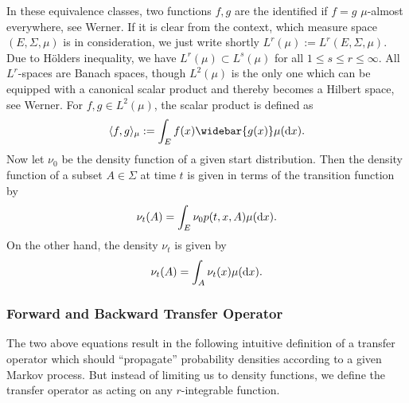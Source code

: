 In these equivalence classes, two functions $f,g$ are the identified if $f=g$ $\mu$-almost everywhere, see Werner\cite[section I.1]{werner2006funktionalanalysis}.
If it is clear from the context, which measure space $(E, \Sigma, \mu)$ is in consideration, we just write shortly $L^r(\mu) := L^r(E,\Sigma,\mu)$.
Due to H\"olders inequality, we have $L^r(\mu) \subset L^s(\mu)$ for all $1 \leq s \leq r \leq \infty$.
All $L^r$-spaces are Banach spaces, though $L^2(\mu)$ is the only one which can be equipped with a canonical scalar product and thereby becomes a Hilbert space, see Werner\cite[section V.1]{werner2006funktionalanalysis}. For $f,g \in L^2(\mu)$, the scalar product is defined as
\begin{equation*}
\langle f,g \rangle_\mu := \int_E f(x) \widebar{g(x)} \mu(\diff x).
\end{equation*}
Now let $\nu_0$ be the density function of a given start distribution.
Then the density function of a subset $A \in \Sigma$ at time $t$ is given in terms of the transition function by
\begin{equation*}
\nu_t(A) = \int_E \nu_0 p(t,x,A) \mu(\mathop{}\!\mathrm{d} x).
\end{equation*}
On the other hand, the density $\nu_t$ is given by
\begin{equation*}
\nu_t(A) = \int_A \nu_t(x) \mu(\mathop{}\!\mathrm{d} x).
\end{equation*}

\subsubsection*{Forward and Backward Transfer Operator}
The two above equations result in the following intuitive definition of a transfer operator which should ``propagate'' probability densities according to a given Markov process. But instead of limiting us to density functions, we define the transfer operator as acting on any $r$-integrable function.

